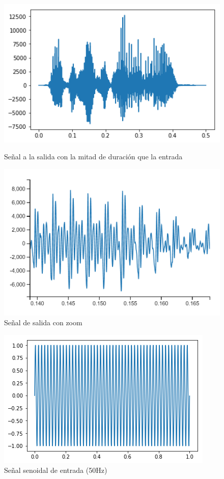 \documentclass[assd_tp2_main.tex]{subfiles}
\begin{document}
\begin{figure}[H]
\centering
  \begin{minipage}{0.4\textwidth}
    \centering
    \includegraphics[width=1\textwidth]{graficos/EJ6/outmitad.png}
    \caption{Señal a la salida con la mitad de duración que la entrada}
    \label{fig:uno}
  \end{minipage}%
  \hspace{5mm}
  \begin{minipage}{0.4\textwidth}
    \centering
    \includegraphics[width=1\textwidth]{graficos/EJ6/outmitadzoom.png}
    \caption{Señal de salida con zoom}
    \label{fig:dos}
  \end{minipage}
\end{figure}

\begin{figure}[H]	
	\centering
	\includegraphics[scale=0.5]{graficos/EJ6/senoin.png}
	\caption{Señal senoidal de entrada (50Hz)}
\end{figure}
\end{document}
